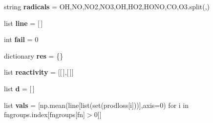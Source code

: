 \begin{DoxyCompactItemize}
\item 
\mbox{\label{namespacedsmacc_1_1parsekpp_1_1functional__group__diff_a938a2f16eaff833fc9703ea4b32c87e0}} 
string {\bfseries radicals} = \textquotesingle{}OH,NO,N\+O2,N\+O3,OH,H\+O2,H\+O\+NO,CO,O3\textquotesingle{}.split(\textquotesingle{},\textquotesingle{})
\item 
\mbox{\label{namespacedsmacc_1_1parsekpp_1_1functional__group__diff_aa6c8dc3fa31be6fc90cf76b200dbd644}} 
list {\bfseries line} = \mbox{[}$\,$\mbox{]}
\item 
\mbox{\label{namespacedsmacc_1_1parsekpp_1_1functional__group__diff_a003c2813e25c0b48ed174715ceb945d9}} 
int {\bfseries fail} = 0
\item 
\mbox{\label{namespacedsmacc_1_1parsekpp_1_1functional__group__diff_aa4a544898538fec685096d2fc525d17c}} 
dictionary {\bfseries res} = \{\}
\item 
\mbox{\label{namespacedsmacc_1_1parsekpp_1_1functional__group__diff_a15a9159004dbaf2566ca17226dab26cd}} 
list {\bfseries reactivity} = \mbox{[}\mbox{[}$\,$\mbox{]},\mbox{[}$\,$\mbox{]}\mbox{]}
\item 
\mbox{\label{namespacedsmacc_1_1parsekpp_1_1functional__group__diff_ac64585b51ca93da136c488c39b33b196}} 
list {\bfseries d} = \mbox{[}$\,$\mbox{]}
\item 
\mbox{\label{namespacedsmacc_1_1parsekpp_1_1functional__group__diff_a59247e81d01785a0bc4fbad55affdd39}} 
list {\bfseries vals} = \mbox{[}np.\+mean(line\mbox{[}list(set(prodloss\mbox{[}i\mbox{]}))\mbox{]},axis=0) for i in fngroups.\+index\mbox{[}fngroups\mbox{[}fn\mbox{]}$>$0\mbox{]}\mbox{]}
\item 
\mbox{\label{namespacedsmacc_1_1parsekpp_1_1functional__group__diff_a1215cb0cd903ed130addd20d47684ae9}} 

\end{DoxyCompactItemize}
